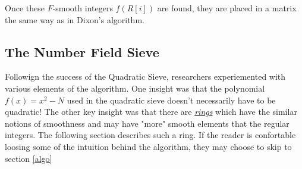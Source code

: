   Once these $F$-smooth integers $f(R[i])$ are found, they are placed in a matrix the same way as in Dixon's algorithm. 
   
\subsection{The Number Field Sieve}
  Followign the success of the Quadratic Sieve, researchers experiemented with various elements of the algorithm. One insight was that the polynomial $f(x) = x^2 - N $ used in the quadratic sieve doesn't necessarily have to be quadratic! The other key insight was that there are \hyperref[ring]{\textit{rings}} which have the similar notions of smoothness and may have "more" smooth elements that the regular integers. The following section describes such a ring. If the reader is confortable loosing some of the intuition behind the algorithm, they may choose to skip to section \ref{algo}

